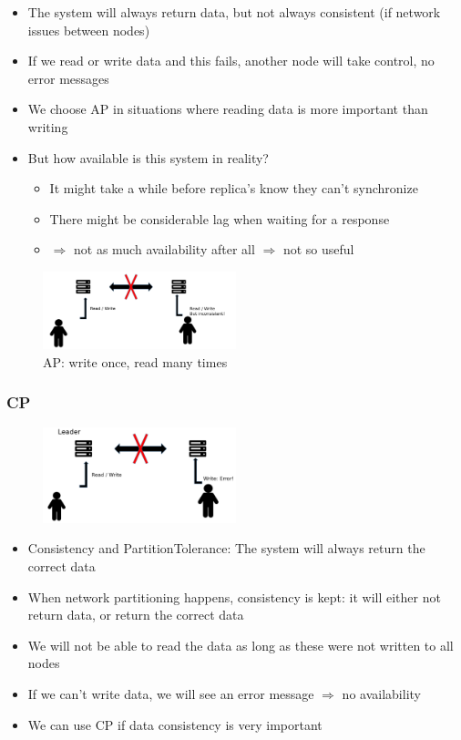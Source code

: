 \documentclass{article}
\begin{document}
\begin{itemize}
    \item The system will always return data, but not always consistent (if network issues between nodes)
    \item If we read or write data and this fails, another node will take control, no error messages
    \item We choose AP in situations where reading data is more important than writing
    \item But how available is this system in reality?
    \begin{itemize}
        \item It might take a while before replica's know they can't synchronize
        \item There might be considerable lag when waiting for a response
        \item $\Rightarrow$ not as much availability after all $\Rightarrow$ not so useful
    \end{itemize}
\end{itemize}

\begin{figure}[H]
    \centering
    \includegraphics[width=0.5\textwidth]{cap-theorem-ap.png}
    \caption{AP: write once, read many times}
\end{figure}


\subsubsection{CP}

\begin{figure}[H]
    \centering
    \includegraphics[width=0.5\textwidth]{cap-theorem-cp.png}
\end{figure}

\begin{itemize}
    \item Consistency and PartitionTolerance: The system will always return the correct data
    \item When network partitioning happens, consistency is kept: it will either not return data, or return the correct data
    \item We will not be able to read the data as long as these were not written to all nodes
    \item If we can't write data, we will see an error message $\Rightarrow$ no availability
    \item We can use CP if data consistency is very important
\end{itemize}
\end{document}
